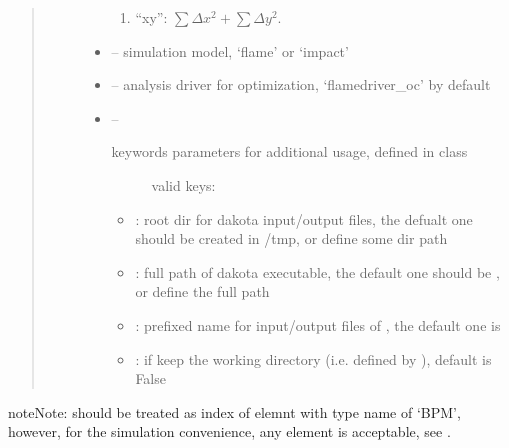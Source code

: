 \documentclass[letterpaper,10pt,english]{sphinxmanual}
\begin{document}
\begin{fulllineitems}
\begin{quote}
\begin{description}
\begin{itemize}
\begin{enumerate}
\item {} 
``xy'': \(\sum \Delta x^2 + \sum \Delta y^2\).

\end{enumerate}


\item {} 
 -- simulation model, `flame' or `impact'

\item {} 
 -- analysis driver for optimization, `flamedriver\_oc' by default

\item {} 
 -- \begin{description}
\item[{keywords parameters for additional usage, defined in  class}] \leavevmode
valid keys:

\end{description}
\begin{itemize}
\item {} 
: root dir for dakota input/output files,
the defualt one should be created in /tmp, or define some dir path

\item {} 
: full path of dakota executable,
the default one should be , or define the full path

\item {} 
: prefixed name for input/output files of , 
the default one is 

\item {} 
: if keep the working directory (i.e. defined by ), 
default is False

\end{itemize}


\end{itemize}

\end{description}\end{quote}

\begin{sphinxadmonition}{note}{Note:}
 should be treated as index of elemnt with type name of `BPM',
however, for the simulation convenience, any element is acceptable, see {\hyperref[\detokenize{src/apidocs/dakopt:genopt.dakopt.DakotaOC.set_bpms}]{}}.
\end{sphinxadmonition}


\end{fulllineitems}
\end{document}
